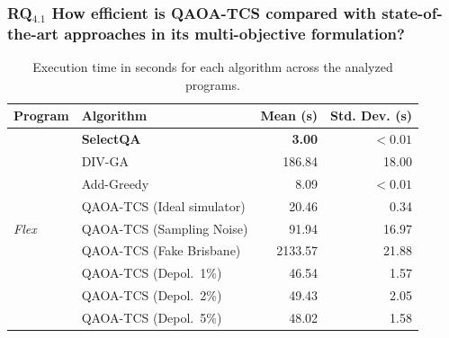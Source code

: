 

\subsubsection{RQ$_{4.1}$ How efficient is \textsc{QAOA-TCS} compared with 
state-of-the-art approaches in its multi-objective formulation?}

\begin{table}[ht]
\centering
\scriptsize
\caption{Execution time in seconds for each algorithm across the analyzed programs.}
\label{tab:execution_time_by_program}
\begin{tabular}{llrr}
\toprule
\textbf{Program} & \textbf{Algorithm} & \textbf{Mean (s)} & \textbf{Std. Dev. (s)} \\
\midrule

\multirow{9}{*}{\textit{Flex}}
& \textbf{SelectQA}                    & \textbf{3.00}   & $<0.01$ \\
& DIV-GA                               & 186.84          & 18.00   \\
& Add-Greedy                           & 8.09            & $<0.01$ \\
& QAOA-TCS (Ideal simulator)           & 20.46           & 0.34    \\
& QAOA-TCS (Sampling Noise)            & 91.94           & 16.97   \\
& QAOA-TCS (Fake Brisbane)             & 2133.57         & 21.88   \\
& QAOA-TCS (Depol.\ 1\%)              & 46.54           & 1.57    \\
& QAOA-TCS (Depol.\ 2\%)              & 49.43           & 2.05    \\
& QAOA-TCS (Depol.\ 5\%)              & 48.02           & 1.58    \\
\midrule


\end{tabular}
\end{table}
